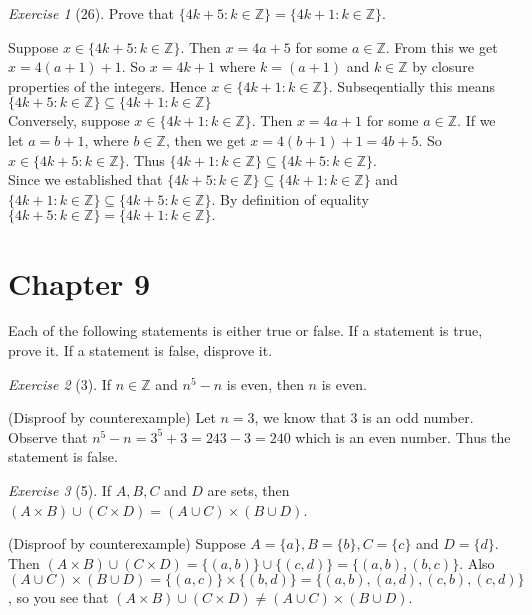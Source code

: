 \documentclass[12pt]{amsart}
\makeatletter
\theoremstyle{remark}
\newtheorem*{exercise}{Exercise}%
\def\ZZ{\ensuremath{\mathbb Z}}
\renewenvironment{proof}[1][\proofname]{\par\doublespacing
  \pushQED{\qed}%
  \normalfont \topsep6\p@\@plus6\p@\relax
  \list{}{%
    \settowidth{\leftmargin}{\itshape\proofname:\hskip\labelsep}%
    \setlength{\labelwidth}{0pt}%
    \setlength{\itemindent}{-\leftmargin}%
  }%
  \item[\hskip\labelsep\itshape#1\@addpunct{:}]\ignorespaces
}{%
  \popQED\endlist\@endpefalse
  \singlespacing
}
\theoremstyle{mycomment}
\makeatother
\begin{document}
\begin{exercise}[26] Prove that $\{4k+5:k\in\ZZ\}=\{4k+1:k\in\ZZ\}$.
\begin{proof}%
Suppose $x \in \{4k + 5: k \in \ZZ\}$. Then $x = 4a + 5$ for some $a \in \ZZ$. From this we get $x = 4(a + 1) + 1$. So $x = 4k + 1$ where $k = (a + 1)$ and $k \in \ZZ$ by closure properties of the integers. Hence $x \in \{4k+1:k\in\ZZ\}$. Subseqentially this means $\{4k + 5:k \in \ZZ\} \subseteq \{4k+1:k\in\ZZ\}$ \\
Conversely, suppose $x \in \{4k+1:k\in\ZZ\}$. Then $x = 4a + 1$ for some $a \in \ZZ$. If we let $a = b+1$, where $b \in \ZZ$, then we get $x = 4(b+1) + 1 = 4b + 5$. So $x \in \{4k+5:k\in\ZZ\}$. Thus $\{4k+1:k\in\ZZ\} \subseteq \{4k+5:k\in\ZZ\}$. \\
Since we established that $\{4k+5:k\in\ZZ\} \subseteq \{4k+1:k\in\ZZ\}$ and $\{4k + 1: k \in \ZZ\} \subseteq \{4k+5: k \in \ZZ \}$. By definition of equality $\{4k+5:k\in\ZZ\}=\{4k+1:k\in\ZZ\}.$
\end{proof}
\end{exercise}
\section*{Chapter 9}

Each of the following statements is either true or false. If a statement is true, prove
it. If a statement is false, disprove it. 
\begin{exercise}[3] If $n\in \ZZ$ and $n^{5}-n$ is even, then $n$ is even.
\begin{proof}%
  (Disproof by counterexample) Let $n = 3$, we know that $3$ is an odd number. Observe that $n^5 - n = 3^5 + 3 = 243 - 3 = 240$ which is an even number. Thus the statement is false. 
\end{proof}
\end{exercise}

\begin{exercise}[5] If $A, B, C$ and $D$ are sets, then $(A\times B)\cup(C\times D)=(A\cup C)\times (B\cup D)$.
\begin{proof}%
  (Disproof by counterexample) Suppose $A = \{a\}, B = \{b\}, C = \{c\}$ and $D = \{d\}$. Then $(A \times B) \cup (C \times D) = \{(a,b)\} \cup \{(c,d)\} = \{(a,b),(b,c)\}$. Also $(A \cup C) \times (B \cup D) = \{(a,c)\} \times \{(b,d)\} = \{(a,b),(a,d),(c,b),(c,d)\}$, so you see that $(A\times B)\cup(C\times D) \neq (A\cup C)\times (B\cup D)$.
\end{proof}
\end{exercise}
\end{document}
